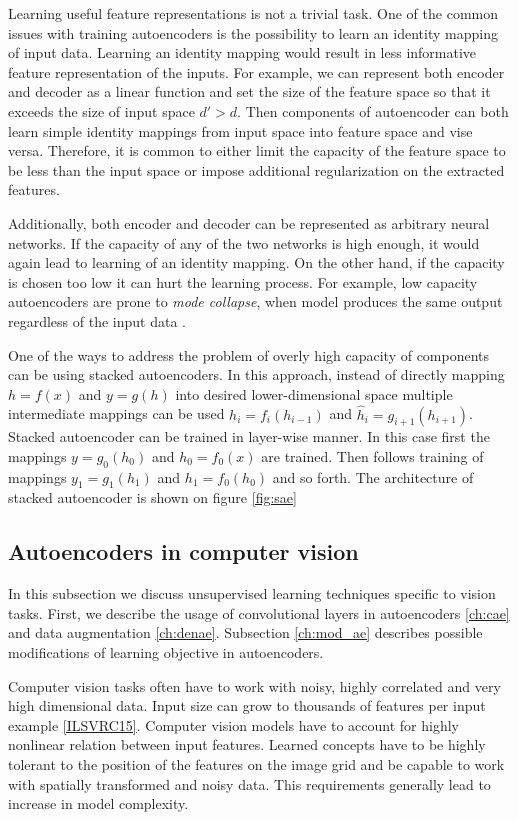 Learning useful feature representations is not a trivial task.
One of the common issues with training autoencoders is the possibility to learn an identity mapping of input data.
Learning an identity mapping would result in less informative feature representation of the inputs.
For example, we can represent both encoder and decoder as a linear function and set the size of the feature space so that it exceeds the size of input space $d' > d$.
Then components of autoencoder can both learn simple identity mappings from input space into feature space and vise versa.
Therefore, it is common to either limit the capacity of the feature space to be less than the input space or impose additional regularization on the extracted features.

Additionally, both encoder and decoder can be represented as arbitrary neural networks.
If the capacity of any of the two networks is high enough, it would again lead to learning of an identity mapping.
On the other hand, if the capacity is chosen too low it can hurt the learning process.
For example, low capacity autoencoders are prone to \textit{mode collapse}, when model produces the same output regardless of the input data \cite{Radford2015}.

One of the ways to address the problem of overly high capacity of components can be using stacked autoencoders.
In this approach, instead of directly mapping $h=f(x)$ and $y=g(h)$ into desired lower-dimensional space multiple intermediate mappings can be used $h_i=f_i(h_{i-1})$ and $\hat{h}_i=g_{i+1}(h_{i+1})$.
Stacked autoencoder can be trained in layer-wise manner.
In this case first the mappings $y=g_0(h_0)$ and $h_0=f_0(x)$ are trained.
Then follows training of mappings $y_1=g_1(h_1)$ and $h_1=f_0(h_0)$ and so forth.
The architecture of stacked autoencoder is shown on figure \ref{fig:sae}




\subsection{Autoencoders in computer vision}\label{ch:dcae}

In this subsection we discuss unsupervised learning techniques specific to vision tasks.
First, we describe the usage of convolutional layers in autoencoders \ref{ch:cae} and data augmentation \ref{ch:denae}.
Subsection \ref{ch:mod_ae} describes possible modifications of learning objective in autoencoders.

Computer vision tasks often have to work with noisy, highly correlated and very high dimensional data. Input size can grow to thousands of features per input example \ref{ILSVRC15}.
Computer vision models have to account for highly nonlinear relation between input features.
Learned concepts have to be highly tolerant to the position of the features on the image grid and be capable to work with spatially transformed and noisy data.
This requirements generally lead to increase in model complexity.

